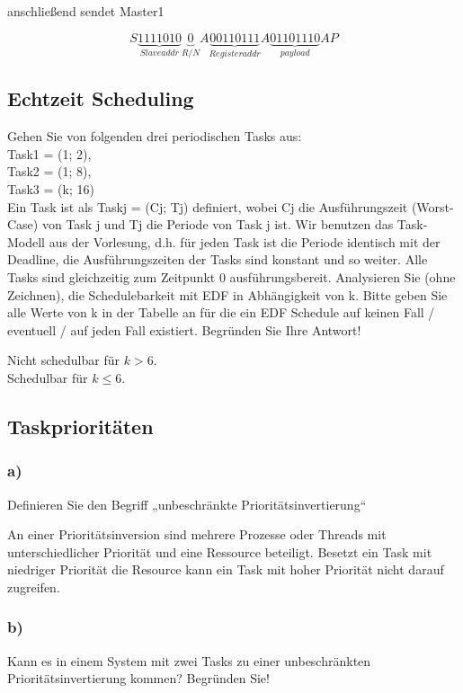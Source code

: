 anschließend sendet Master1

\begin{equation}
  S\underbrace{1111010}_{Slave addr}\underbrace{0}_{R/N}A\underbrace{00110111}_{Register addr}A\underbrace{01101110}_{payload}AP
\end{equation}

\subsection{Echtzeit Scheduling}
Gehen Sie von folgenden drei periodischen Tasks aus:\\
Task1 = (1; 2),\\
Task2 = (1; 8),\\
Task3 = (k; 16)\\
Ein Task ist als Taskj = (Cj; Tj) definiert, wobei Cj die Ausführungszeit (Worst-Case) von Task j und Tj die
Periode von Task j ist. Wir benutzen das Task-Modell aus der Vorlesung, d.h. für jeden Task ist die Periode
identisch mit der Deadline, die Ausführungszeiten der Tasks sind konstant und so weiter. Alle Tasks sind
gleichzeitig zum Zeitpunkt 0 ausführungsbereit.
Analysieren Sie (ohne Zeichnen), die Schedulebarkeit mit EDF in Abhängigkeit von k. Bitte geben Sie alle
Werte von k in der Tabelle an für die ein EDF Schedule auf keinen Fall / eventuell / auf jeden Fall existiert.
Begründen Sie Ihre Antwort!

Nicht schedulbar für $k>6$.\\
Schedulbar für $k \leq 6$.

\subsection{Taskprioritäten}
\subsubsection{a)}
Definieren Sie den Begriff „unbeschränkte Prioritätsinvertierung“

An einer Prioritätsinversion sind mehrere Prozesse oder Threads mit unterschiedlicher Priorität und eine Ressource beteiligt. Besetzt ein
Task mit niedriger Priorität die Resource kann ein Task mit hoher Priorität nicht darauf zugreifen. 
\subsubsection{b)}
Kann es in einem System mit zwei Tasks zu einer unbeschränkten Prioritätsinvertierung kommen?
Begründen Sie!

